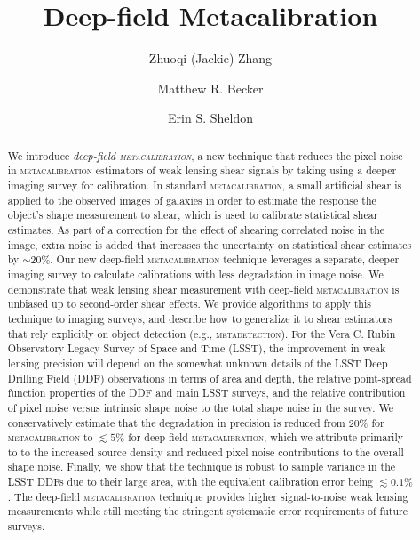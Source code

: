 \documentclass[twocolumn]{openjournal}
\makeatletter
\newcommand{\mdet}{\textsc{metadetection}\@\xspace}
\newcommand{\mcal}{\textsc{metacalibration}\@\xspace}
\makeatother
\begin{document}
\title{Deep-field Metacalibration}

\author{Zhuoqi (Jackie) Zhang}
\author{Matthew R. Becker}
\author{Erin S. Sheldon}


\begin{abstract}

    We introduce \textit{deep-field \textsc{metacalibration}}, a new technique
    that reduces the pixel noise in \mcal estimators of weak lensing shear
    signals by taking using a deeper imaging survey for
    calibration. In standard \mcal, a small artificial shear is applied to the
    observed images of galaxies in order to estimate the response the
    object's shape measurement to shear, which is used to calibrate statistical
    shear estimates.  As part of a correction for the effect of shearing correlated noise
    in the image, extra noise
    is added that increases the uncertainty on statistical shear
    estimates by $\sim 20$\%.  Our new deep-field \mcal technique leverages a
    separate, deeper imaging survey to calculate calibrations with less
    degradation in image noise.  We demonstrate that weak lensing shear
    measurement with deep-field \mcal is unbiased up to second-order shear
    effects.  We provide algorithms to apply this technique to imaging surveys,
    and describe how to generalize it to shear estimators that rely explicitly
    on object detection (e.g., \mdet).   For the Vera C. Rubin Observatory
    Legacy Survey of Space and Time (LSST), the improvement in weak lensing
    precision will depend on the somewhat unknown details of the LSST Deep
    Drilling Field (DDF) observations in terms of area and depth, the relative
    point-spread function properties of the DDF and main LSST surveys, and the
    relative contribution of pixel noise versus intrinsic shape noise to the
    total shape noise in the survey. We conservatively estimate that the
    degradation in precision is reduced from 20\% for \mcal to $\lesssim5$\% for
    deep-field \mcal, which we attribute primarily to to the increased source
    density and reduced pixel noise contributions to the overall shape noise.
    Finally, we show that the technique is robust to sample variance in the
    LSST DDFs due to their large area, with the equivalent calibration
    error being $\lesssim0.1\%$. The deep-field \mcal technique provides higher
    signal-to-noise weak lensing measurements while still meeting the stringent
    systematic error requirements of future surveys.

\end{abstract}
\end{document}
